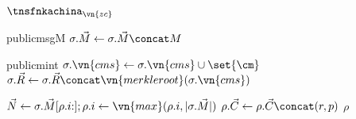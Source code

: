 \begin{transitionfn}{$\tnsfnkachina_{\vn{zc}}$}
  \begin{receivequery}{public}{msg}{M}
    \State \Let $\sigma.\vec{M} \gets \sigma.\vec{M} \concat M$
  \end{receivequery}
  
  \begin{receivequery}{public}{mint}{\cm}
    \State \Let $\sigma.\vn{cms} \gets \sigma.\vn{cms} \cup \set{\cm}$
    \State \Let $\sigma.\vec{R} \gets \sigma.\vec{R} \concat \vn{merkleroot}(\sigma.\vn{cms})$
  \end{receivequery}

  \mknorm
  \begin{helpers}
      \State \Let $\vec{N} \gets \sigma.\vec{M}[\rho.i{:}]; \rho.i \gets
        \vn{max}(\rho.i, |\sigma.\vec{M}|)$
            \Continue
          \EndIf
            \Continue
          \EndIf
          \State \Let $\rho.\vec{C} \gets \rho.\vec{C} \concat (r, p)$
        \EndIf
      \EndFor
      \State \Return $\rho$
    \EndFunction
  \end{helpers}
\end{transitionfn}
